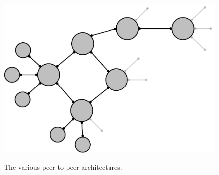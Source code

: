 \begin{figure}[ht]
{  \includegraphics[scale=0.25]{img/pdf/unstructured-hierarchical.pdf}
  \label{figure:p2p-archs:unstructured-hierarchical}
}\qquad\qquad
{}
\caption{The various peer-to-peer architectures.}
\label{figure:p2p-archs}
\end{figure}

